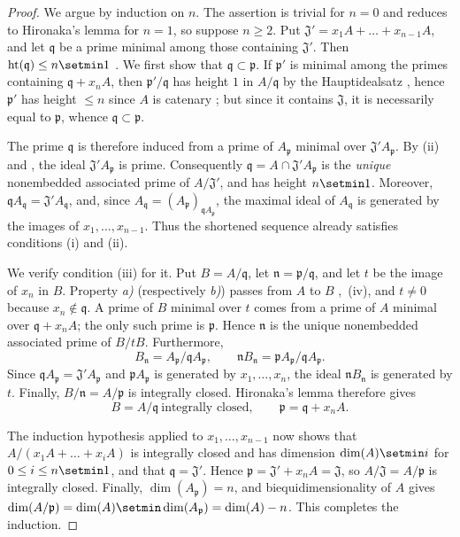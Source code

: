 \begin{proof}
We argue by induction on $n$.  The assertion is trivial for
$n=0$ and reduces to Hironaka's lemma  for $n=1$, so
suppose $n\geq2$.
Put $\mathfrak J'=x_1A+\ldots+x_{n-1}A$,
and let $\mathfrak q$ be a prime minimal among those containing
$\mathfrak J'$.  Then
$\operatorname{ht}(\mathfrak q)\leq n\setmin 1$
.  We first show that
$\mathfrak q\subset\mathfrak p$.  If $\mathfrak p'$ is minimal
among the primes containing $\mathfrak q+x_nA$, then
$\mathfrak p'/\mathfrak q$ has height $1$ in $A/\mathfrak q$ by the
Hauptidealsatz , hence $\mathfrak p'$ has height
$\leq n$ since $A$ is catenary ; but since it
contains $\mathfrak J$, it is necessarily equal to $\mathfrak p$, whence
$\mathfrak q\subset\mathfrak p$.


The prime $\mathfrak q$ is therefore induced from a prime of
$A_{\mathfrak p}$ minimal over
$\mathfrak J'A_{\mathfrak p}$.  By {\rm(ii)} and
, the ideal
$\mathfrak J'A_{\mathfrak p}$ is prime.  Consequently $\mathfrak q=A\cap\mathfrak J'A_{\mathfrak p}$
is the \emph{unique} nonembedded associated prime of
$A/\mathfrak J'$, and has height $n\setmin 1$.  Moreover, $\mathfrak qA_{\mathfrak q}
=\mathfrak J'A_{\mathfrak q}$,
and, since
$A_{\mathfrak q}=(A_{\mathfrak p})_{\mathfrak qA_{\mathfrak p}}$,
the maximal ideal of $A_{\mathfrak q}$ is generated by the
images of $x_1,\ldots,x_{n-1}$.  Thus the shortened sequence
already satisfies conditions {\rm(i)} and {\rm(ii)}.

We verify condition {\rm(iii)} for it.  Put
$B=A/\mathfrak q$, let $\mathfrak n=\mathfrak p/\mathfrak q$,
and let $t$ be the image of $x_n$ in $B$.  Property \emph{a)}
(respectively \emph{b)}) passes from $A$ to $B$
,~(iv), and $t\ne0$ because
$x_n\notin\mathfrak q$.  A prime of $B$ minimal over $t$ comes
from a prime of $A$ minimal over $\mathfrak q+x_nA$; the only
such prime is $\mathfrak p$.  Hence $\mathfrak n$ is the unique
nonembedded associated prime of $B/tB$.  Furthermore,
\[
  B_{\mathfrak n}
    =A_{\mathfrak p}/\mathfrak qA_{\mathfrak p},
  \qquad
  \mathfrak nB_{\mathfrak n}
    =\mathfrak pA_{\mathfrak p}/\mathfrak qA_{\mathfrak p}.
\]
Since
$\mathfrak qA_{\mathfrak p}=\mathfrak J'A_{\mathfrak p}$
and $\mathfrak pA_{\mathfrak p}$ is generated by
$x_1,\ldots,x_n$, the ideal
$\mathfrak nB_{\mathfrak n}$ is generated by $t$.  Finally,
$B/\mathfrak n=A/\mathfrak p$ is integrally closed.  Hironaka's
lemma therefore gives
\[
  B=A/\mathfrak q\ \text{integrally closed},
  \qquad
  \mathfrak p=\mathfrak q+x_nA.
\]

The induction hypothesis applied to
$x_1,\ldots,x_{n-1}$ now shows that
$A/(x_1A+\ldots+x_iA)$ is integrally closed and has dimension
$\dim(A)\setmin i$ for $0\leq i\leq n\setmin 1$, and that
$\mathfrak q=\mathfrak J'$.  Hence $\mathfrak p=\mathfrak J'+x_nA=\mathfrak J$,
so $A/\mathfrak J=A/\mathfrak p$ is integrally closed.  Finally,
$\dim(A_{\mathfrak p})=n$, and biequidimensionality of $A$
gives $\dim(A/\mathfrak p)
=\dim(A)\setmin\dim(A_{\mathfrak p})
=\dim(A)-n$.
This completes the induction.
\end{proof}
